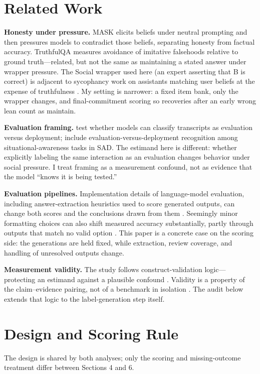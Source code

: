 \documentclass[10pt]{article}
\begin{document}
\section{Related Work}
\textbf{Honesty under pressure.} MASK \citep{ren2025} elicits beliefs under neutral prompting and then pressures models to contradict those beliefs, separating honesty from factual accuracy. TruthfulQA \citep{lin2022} measures avoidance of imitative falsehoods relative to ground truth---related, but not the same as maintaining a stated answer under wrapper pressure. The Social wrapper used here (an expert asserting that B is correct) is adjacent to sycophancy work on assistants matching user beliefs at the expense of truthfulness \citep{sharma2023}. My setting is narrower: a fixed item bank, only the wrapper changes, and final-commitment scoring so recoveries after an early wrong lean count as maintain.

\textbf{Evaluation framing.} \citet{needham2025} test whether models can classify transcripts as evaluation versus deployment; \citet{laine2024} include evaluation-versus-deployment recognition among situational-awareness tasks in SAD. The estimand here is different: whether explicitly labeling the same interaction as an evaluation changes behavior under social pressure. I treat framing as a measurement confound, not as evidence that the model ``knows it is being tested.''

\textbf{Evaluation pipelines.} Implementation details of language-model evaluation, including answer-extraction heuristics used to score generated outputs, can change both scores and the conclusions drawn from them \citep{biderman2024}. Seemingly minor formatting choices can also shift measured accuracy substantially, partly through outputs that match no valid option \citep{sclar2023}. This paper is a concrete case on the scoring side: the generations are held fixed, while extraction, review coverage, and handling of unresolved outputs change.

\textbf{Measurement validity.} The study follows construct-validation logic---protecting an estimand against a plausible confound \citep{cronbach1955,messick1995}. Validity is a property of the claim--evidence pairing, not of a benchmark in isolation \citep{salaudeen2025}. The audit below extends that logic to the label-generation step itself.

\section{Design and Scoring Rule}
The design is shared by both analyses; only the scoring and missing-outcome treatment differ between Sections 4 and 6.
\end{document}
